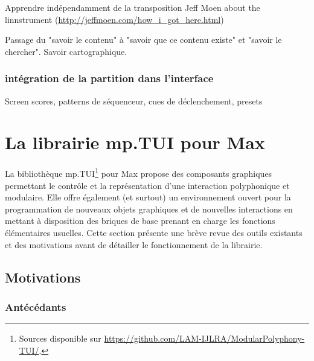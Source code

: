 Apprendre indépendamment de la transposition
 Jeff Moen about the linnstrument (\url{http://jeffmoen.com/how_i_got_here.html})

Passage du "savoir le contenu" à "savoir que ce contenu existe" et "savoir le chercher".
Savoir cartographique.


\subsubsection{intégration de la partition dans l'interface}
Screen scores, patterns de séquenceur, cues de déclenchement, presets



\section{La librairie mp.TUI pour Max}


\noindent La bibliothèque mp.TUI\footnote{Sources disponible sur \url{https://github.com/LAM-IJLRA/ModularPolyphony-TUI/}.} pour Max propose des composants graphiques permettant le contrôle et la représentation d'une interaction polyphonique et modulaire. Elle offre également (et surtout) un environnement ouvert pour la programmation de nouveaux objets graphiques et de nouvelles interactions en mettant à disposition des briques de base prenant en charge les fonctions élémentaires usuelles. Cette section présente une brève revue des outils existants et des motivations avant de détailler le fonctionnement de la librairie.

\subsection{Motivations}

\subsubsection{Antécédants} 

